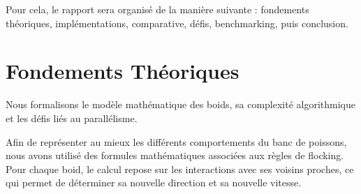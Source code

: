 \documentclass[conference]{IEEEtran}
\begin{document}
Pour cela, le rapport sera organisé de la manière suivante : fondements théoriques, implémentations, comparative, défis, benchmarking, puis conclusion.

\section{Fondements Théoriques}
Nous formalisons le modèle mathématique des boids, sa complexité algorithmique et les défis liés au parallélisme.

Afin de représenter au mieux les différents comportements du banc de poissons, nous avons utilisé des formules mathématiques associées aux règles de flocking. Pour chaque boid, le calcul repose sur les interactions avec ses voisins proches, ce qui permet de déterminer sa nouvelle direction et sa nouvelle vitesse.
\end{document}
